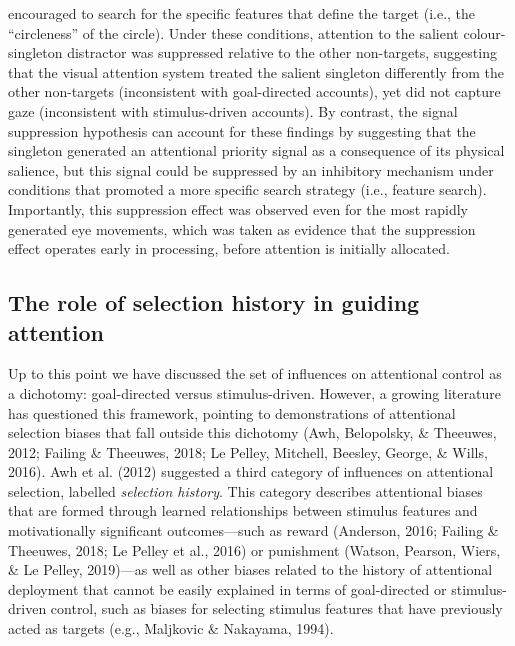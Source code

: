 \documentclass[man, a4paper, noextraspace, 11pt,floatsintext]{apa6}
\theoremstyle{definition}
\theoremstyle{definition}
\theoremstyle{definition}
\theoremstyle{remark}
\begin{document}
encouraged to search for the specific features that define the target
(i.e., the \enquote{circleness} of the circle). Under these conditions,
attention to the salient colour-singleton distractor was suppressed
relative to the other non-targets, suggesting that the visual attention
system treated the salient singleton differently from the other
non-targets (inconsistent with goal-directed accounts), yet did not
capture gaze (inconsistent with stimulus-driven accounts). By contrast,
the signal suppression hypothesis can account for these findings by
suggesting that the singleton generated an attentional priority signal
as a consequence of its physical salience, but this signal could be
suppressed by an inhibitory mechanism under conditions that promoted a
more specific search strategy (i.e., feature search). Importantly, this
suppression effect was observed even for the most rapidly generated eye
movements, which was taken as evidence that the suppression effect
operates early in processing, before attention is initially allocated.

\subsection{The role of selection history in guiding
attention}\label{the-role-of-selection-history-in-guiding-attention}

Up to this point we have discussed the set of influences on attentional
control as a dichotomy: goal-directed versus stimulus-driven. However, a
growing literature has questioned this framework, pointing to
demonstrations of attentional selection biases that fall outside this
dichotomy (Awh, Belopolsky, \& Theeuwes, 2012; Failing \& Theeuwes,
2018; Le Pelley, Mitchell, Beesley, George, \& Wills, 2016). Awh et al.
(2012) suggested a third category of influences on attentional
selection, labelled \emph{selection history}. This category describes
attentional biases that are formed through learned relationships between
stimulus features and motivationally significant outcomes---such as
reward (Anderson, 2016; Failing \& Theeuwes, 2018; Le Pelley et al.,
2016) or punishment (Watson, Pearson, Wiers, \& Le Pelley, 2019)---as
well as other biases related to the history of attentional deployment
that cannot be easily explained in terms of goal-directed or
stimulus-driven control, such as biases for selecting stimulus features
that have previously acted as targets (e.g., Maljkovic \& Nakayama,
1994).
\end{document}

